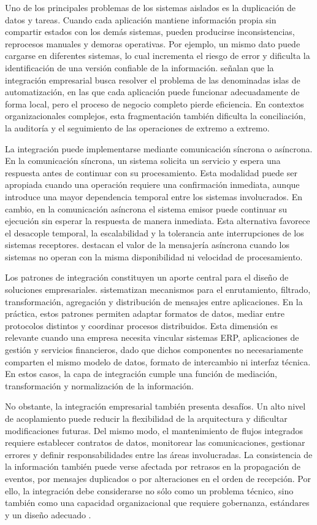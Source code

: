 Uno de los principales problemas de los sistemas aislados es la duplicación de datos y tareas. Cuando cada aplicación mantiene información propia sin compartir estados con los demás sistemas, pueden producirse inconsistencias, reprocesos manuales y demoras operativas. Por ejemplo, un mismo dato puede cargarse en diferentes sistemas, lo cual incrementa el riesgo de error y dificulta la identificación de una versión confiable de la información. \citet{hohpe2003} señalan que la integración empresarial busca resolver el problema de las denominadas islas de automatización, en las que cada aplicación puede funcionar adecuadamente de forma local, pero el proceso de negocio completo pierde eficiencia. En contextos organizacionales complejos, esta fragmentación también dificulta la conciliación, la auditoría y el seguimiento de las operaciones de extremo a extremo.

La integración puede implementarse mediante comunicación síncrona o asíncrona. En la comunicación síncrona, un sistema solicita un servicio y espera una respuesta antes de continuar con su procesamiento. Esta modalidad puede ser apropiada cuando una operación requiere una confirmación inmediata, aunque introduce una mayor dependencia temporal entre los sistemas involucrados. En cambio, en la comunicación asíncrona el sistema emisor puede continuar su ejecución sin esperar la respuesta de manera inmediata. Esta alternativa favorece el desacople temporal, la escalabilidad y la tolerancia ante interrupciones de los sistemas receptores. \citet{hohpe2003} destacan el valor de la mensajería asíncrona cuando los sistemas no operan con la misma disponibilidad ni velocidad de procesamiento.

Los patrones de integración constituyen un aporte central para el diseño de soluciones empresariales. \citet{hohpe2003} sistematizan mecanismos para el enrutamiento, filtrado, transformación, agregación y distribución de mensajes entre aplicaciones. En la práctica, estos patrones permiten adaptar formatos de datos, mediar entre protocolos distintos y coordinar procesos distribuidos. Esta dimensión es relevante cuando una empresa necesita vincular sistemas ERP, aplicaciones de gestión y servicios financieros, dado que dichos componentes no necesariamente comparten el mismo modelo de datos, formato de intercambio ni interfaz técnica. En estos casos, la capa de integración cumple una función de mediación, transformación y normalización de la información.

No obstante, la integración empresarial también presenta desafíos. Un alto nivel de acoplamiento puede reducir la flexibilidad de la arquitectura y dificultar modificaciones futuras. Del mismo modo, el mantenimiento de flujos integrados requiere establecer contratos de datos, monitorear las comunicaciones, gestionar errores y definir responsabilidades entre las áreas involucradas. La consistencia de la información también puede verse afectada por retrasos en la propagación de eventos, por mensajes duplicados o por alteraciones en el orden de recepción. Por ello, la integración debe considerarse no sólo como un problema técnico, sino también como una capacidad organizacional que requiere gobernanza, estándares y un diseño adecuado \citep{hohpe2003}.

